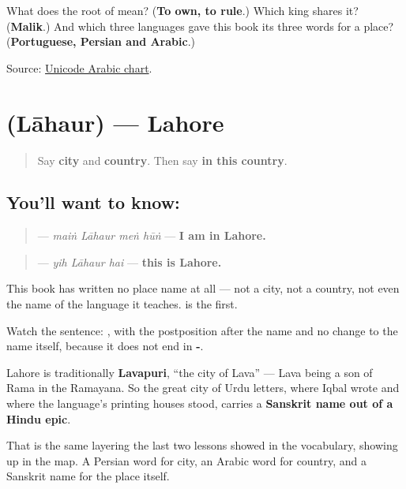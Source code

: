\begin{tcolorbox}[breakable,colback=teal!4,colframe=teal!35!black,title={Before you move on}]
What does the root of \textbf{} mean? (\textbf{To own, to rule}.) Which king shares it? (\textbf{Malik}.) And which three languages gave this book its three words for a place? (\textbf{Portuguese, Persian and Arabic}.)

Source: \href{https://www.unicode.org/charts/PDF/U0600.pdf}{Unicode Arabic chart}.
\end{tcolorbox}
\section[\texorpdfstring{\ur{لاہور} (Lāhaur)}{لاہور (Lāhaur)}]{ (Lāhaur) — Lahore}

\label{lesson:UR-C27-lahore}



\begin{quote}
Say \textbf{city} and \textbf{country}. Then say \textbf{in this country}.
\end{quote}

\subsection*{You'll want to know: }
\begin{quote}
\textbf{   } — \emph{maiṅ Lāhaur meṅ hūṅ} — \textbf{I am in Lahore.}
\end{quote}

\begin{quote}
\textbf{  } — \emph{yih Lāhaur hai} — \textbf{this is Lahore.}
\end{quote}

This book has written no place name at all — not a city, not a country, not even the name of the language it teaches. \textbf{} is the first.

Watch the sentence: \textbf{ }, with the postposition after the name and no change to the name itself, because it does not end in \textbf{-}.

\begin{cousinweb}
Lahore is traditionally \textbf{Lavapuri}, \textquotedblleft{}the city of Lava\textquotedblright{} — Lava being a son of Rama in the Ramayana. So the great city of Urdu letters, where Iqbal wrote and where the language's printing houses stood, carries a \textbf{Sanskrit name out of a Hindu epic}.

That is the same layering the last two lessons showed in the vocabulary, showing up in the map. A Persian word for city, an Arabic word for country, and a Sanskrit name for the place itself.
\end{cousinweb}

